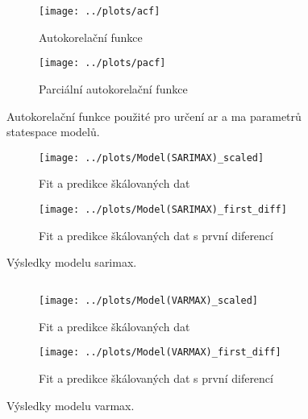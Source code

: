 \documentclass[a4paper,12pt, czech]{article}
\begin{document}
\begin{figure}[htb]
	\begin{subfigure}[t]{1\linewidth}
		\centering
		\texttt{[image: ../plots/acf]}
		\caption{Autokorelační funkce}
		\label{fig:acf}
	\end{subfigure}
	\begin{subfigure}[t]{1\linewidth}
		\centering
		\texttt{[image: ../plots/pacf]}
		\caption{Parciální autokorelační funkce}
		\label{fig:pacf}
	\end{subfigure}
	\caption{Autokorelační funkce použité pro určení \gls{ar} a \gls{ma} parametrů statespace modelů.}\label{fig:auto_func}
\end{figure}



\begin{figure}[htb]
	\begin{subfigure}[t]{.5\linewidth}
		\centering
		\texttt{[image: ../plots/Model(SARIMAX)\_scaled]}
		\caption{Fit a predikce škálovaných dat}
		\label{fig:sarimax_scaled}
	\end{subfigure}
	\begin{subfigure}[t]{.5\linewidth}
		\centering
		\texttt{[image: ../plots/Model(SARIMAX)\_first\_diff]}
		\caption{Fit a predikce škálovaných dat s první diferencí}
		\label{fig:sarimax_fd}
	\end{subfigure}
	\caption{Výsledky modelu \gls{sarimax}.}\label{fig:sarimax}
\end{figure}


\subsection{}

\begin{figure}[htb]
	\begin{subfigure}[t]{.5\linewidth}
		\centering
		\texttt{[image: ../plots/Model(VARMAX)\_scaled]}
		\caption{Fit a predikce škálovaných dat}
		\label{fig:varmax_scaled}
	\end{subfigure}
	\begin{subfigure}[t]{.5\linewidth}
		\centering
		\texttt{[image: ../plots/Model(VARMAX)\_first\_diff]}
		\caption{Fit a predikce škálovaných dat s první diferencí}
		\label{fig:varmax_fd}
	\end{subfigure}
	\caption{Výsledky modelu \gls{varmax}.}\label{fig:varmax}
\end{figure}
\end{document}
